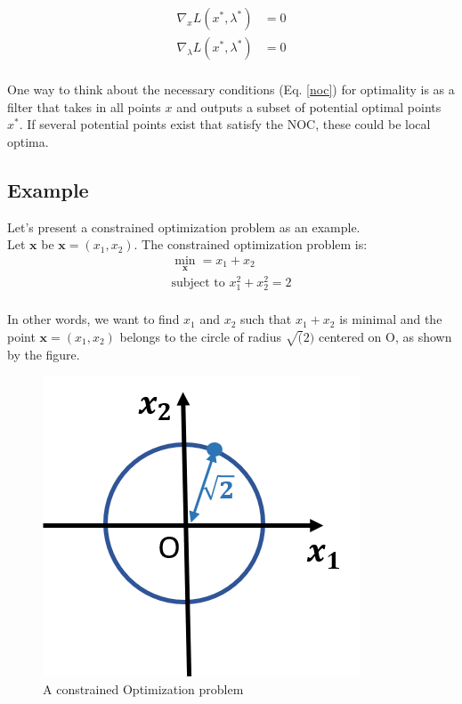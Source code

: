 ﻿\documentclass[twoside]{article}
\begin{document}
\begin{equation} \label{noc}
\begin{split}
\nabla_x L(x^*,\lambda^*) &= 0 \\
\nabla_\lambda L(x^*,\lambda^*) &= 0 \\
\end{split}
\end{equation}

One way to think about the necessary conditions (Eq. \ref{noc}) for optimality is as a filter that takes in all points $x$ and outputs a subset of potential optimal points $x^*$. If several potential points exist that satisfy the NOC, these could be local optima.

\subsection{Example}

Let's present a constrained optimization problem as an example. \\
Let $\mathbf{x}$ be $\mathbf{x} = (x_1, x_2)$. The constrained optimization problem is: 
\begin{equation}\label{ex_optim}
\begin{array}{c}
\min_{\mathbf{x}} = x_1 + x_2 \\
\text{subject to } x_1^2 + x_2^2 = 2 \\
\end{array}
\end{equation}


In other words, we want to find $x_1$ and $x_2$ such that $x_1 + x_2$ is minimal and the point $\mathbf{x} = (x_1, x_2)$ belongs to the circle of radius $\sqrt(2)$ centered on O, as shown by the figure. 

\begin{figure}[ht]
    \centering
    \includegraphics[scale = 0.7]{Constrainted_Optim1.png}
    \caption{A constrained Optimization problem}
    \label{fig:constr_optim}
\end{figure}
\end{document}
